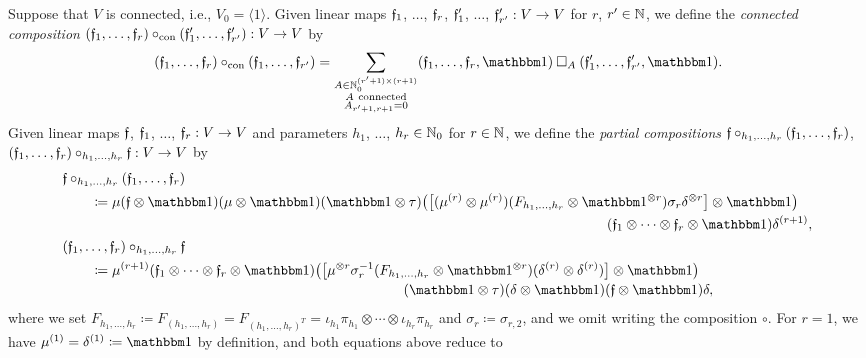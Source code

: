 \documentclass[\MainFolder/Text.tex]{subfiles}
\begin{document}
\begin{Definition}
Suppose that $V$ is connected, i.e., $V_0 = \langle 1\rangle$. Given linear maps $\mathfrak{f}_1$, $\dotsc$, $\mathfrak{f}_r$, $\mathfrak{f}_1'$, $\dotsc$, $\mathfrak{f}_{r'}': V\rightarrow V$ for $r$, $r'\in \mathbb{N}$, we define the \emph{connected composition} $(\mathfrak{f}_1, \dotsc, \mathfrak{f}_r)\circ_{\mathrm{con}}(\mathfrak{f}_1',\dotsc,\mathfrak{f}_{r'}'): V \rightarrow V$ by
\[ (\MVMorF_1, \dotsc, \MVMorF_r)\circ_{\mathrm{con}}(\MVMorF_1,\dotsc,\MVMorF_{r'}) = \sum_{\substack{A\in \N_0^{(r'+1)\times (r+1)}\\ A\  \mathrm{connected} \\ A_{r'+1,r+1} = 0 }} (\MVMorF_1,\dotsc,\MVMorF_r,\Id)\SquareComp_A (\MVMorF_1',\dotsc,\MVMorF_{r'}',\Id).\]
Given linear maps $\mathfrak{f}$, $\mathfrak{f}_1$, $\dotsc$, $\mathfrak{f}_r: V \rightarrow V$ and parameters $h_1$, $\dotsc$, $h_r\in \mathbb{N}_0$ for $r\in \mathbb{N}$, we define the \emph{partial compositions} $\mathfrak{f}\circ_{h_1, \dotsc, h_r}(\mathfrak{f}_1, \dotsc, \mathfrak{f}_r)$, $(\mathfrak{f}_1, \dotsc, \mathfrak{f}_r)\circ_{h_1, \dotsc, h_r}\mathfrak{f}: V\rightarrow V$ by
\begin{align*}
&\MVMorF\circ_{h_1, \dotsc, h_r}(\MVMorF_1, \dotsc, \MVMorF_r) \\
&\qquad\coloneqq\begin{multlined}[t]\MVProd(\MVMorF\otimes \Id)(\MVProd\otimes\Id)(\Id\otimes \tau)\bigl(\bigl[(\MVProd^{(r)}\otimes \MVProd^{(r)})(F_{h_1,\dotsc,h_r} \otimes \Id^{\otimes r})\sigma_r\MVCoProd^{\otimes r}\bigr] \otimes \Id \bigr)\\(\MVMorF_1\otimes \dotsb \otimes \MVMorF_r\otimes \Id)\MVCoProd^{(r+1)},\end{multlined}\\
&(\MVMorF_1, \dotsc, \MVMorF_r)\circ_{h_1, \dotsc, h_r}\MVMorF\\
&\qquad\coloneqq\begin{multlined}[t]\MVProd^{(r+1)}(\MVMorF_1\otimes\dotsb\otimes\MVMorF_r\otimes\Id) \bigl(\bigl[\MVProd^{\otimes r}\sigma_r^{-1}(F_{h_1,\dotsc,h_r}\otimes\Id^{\otimes r})(\MVCoProd^{(r)}\otimes\MVCoProd^{(r)})\bigr]\otimes\Id\bigr)\\(\Id\otimes\tau)(\MVCoProd\otimes\Id)(\MVMorF\otimes\Id)\MVCoProd,\end{multlined}
\end{align*}
where we set $F_{h_1,\dotsc, h_r} \coloneqq F_{(h_1,\dotsc,h_r)} = F_{(h_1,\dotsc,h_r)^T}=\iota_{h_1}\pi_{h_1} \otimes \dotsb \otimes \iota_{h_r}\pi_{h_r}$ and $\sigma_r \coloneqq \sigma_{r,2}$, and we omit writing the composition $\circ$. For $r=1$, we have $\MVProd^{(1)} = \MVCoProd^{(1)}\coloneqq \Id$ by definition, and both equations above reduce to 

\end{Definition}
\end{document}
